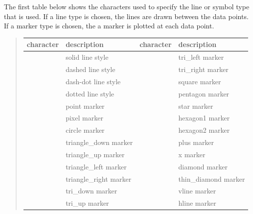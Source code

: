 \documentclass[letterpaper,10pt,english]{sphinxmanual}
\begin{document}
The first table below shows the characters used to specify the line or symbol type that is used.  If a line type is chosen, the lines are drawn between the data points.  If a marker type is chosen, the a marker is plotted at each data point.
\begin{quote}

\begin{tabulary}{\linewidth}{|L|L|L|L|}
\hline
\textbf{
character
} & \textbf{
description
} & \textbf{
character
} & \textbf{
description
}\\\hline

\code{-}
 & 
solid line style
 & 
 & 
tri\_left marker
\\\hline

\code{-{-}}
 & 
dashed line style
 & 
 & 
tri\_right marker
\\\hline

 & 
dash-dot line style
 & 
 & 
square marker
\\\hline

\code{:}
 & 
dotted line style
 & 
 & 
pentagon marker
\\\hline

 & 
point marker
 & 
\code{*}
 & 
star marker
\\\hline

\code{,}
 & 
pixel marker
 & 
 & 
hexagon1 marker
\\\hline

 & 
circle marker
 & 
 & 
hexagon2 marker
\\\hline

 & 
triangle\_down marker
 & 
\code{+}
 & 
plus marker
\\\hline

\code{\textasciicircum{}}
 & 
triangle\_up marker
 & 
 & 
x marker
\\\hline

\code{\textless{}}
 & 
triangle\_left marker
 & 
 & 
diamond marker
\\\hline

\code{\textgreater{}}
 & 
triangle\_right marker
 & 
 & 
thin\_diamond marker
\\\hline

 & 
tri\_down marker
 & 
\code{\textbar{}}
 & 
vline marker
\\\hline

 & 
tri\_up marker
 & 
\code{\_}
 & 
hline marker
\\\hline
\end{tabulary}

\end{quote}
\end{document}
